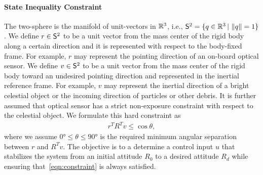 \paragraph{State Inequality Constraint}\label{sec:state_inequality_constraint}
The two-sphere is the manifold of unit-vectors in \( \mathbb{R}^3 \), i.e., \( \mathsf{S}^2 = \{ q \in \mathbb{R}^3 \,  \vert \, \left\| q \right\| = 1 \}\).
We define \( r \in \mathsf{S}^2 \) to be a unit vector from the mass center of the rigid body along a certain direction and it is represented with respect to the body-fixed frame.
For example, \( r \) may represent the pointing direction of an on-board optical sensor.
We define \( v \in \mathsf{S}^2 \) to be a unit vector from the mass center of the rigid body toward an undesired pointing direction and represented in the inertial reference frame.
For example, \( v \) may represent the inertial direction of a bright celestial object or the incoming direction of particles or other debris.
It is further assumed that optical sensor has a strict non-exposure constraint with respect to the celestial object.
We formulate this hard constraint as
\begin{align}
	r^T R^T v \leq \cos \theta , \label{eqn:constraint}
\end{align}
where we assume \( \ang{0} \leq \theta \leq \ang{90}  \) is the required minimum angular separation between \( r \) and \( R^T v \). 
The objective is to a determine a control input \( u \) that stabilizes the system from an initial attitude \( R_0 \) to a desired attitude \( R_d \) while ensuring that~\cref{eqn:constraint} is always satisfied.

